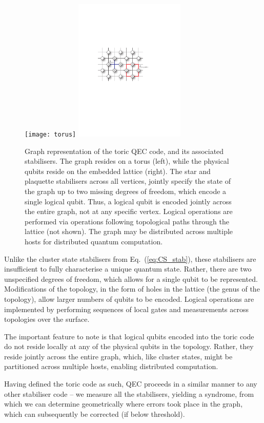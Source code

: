\begin{figure}[htpb]
	\texttt{[image: torus]}
	\includegraphics[width=0.47\textwidth]{toric_code}
	\caption{Graph representation of the toric QEC code, and its associated stabilisers. The graph resides on a torus (left), while the physical qubits reside on the embedded lattice (right). The star and plaquette stabilisers across all vertices, jointly specify the state of the graph up to two missing degrees of freedom, which encode a single logical qubit. Thus, a logical qubit is encoded jointly across the entire graph, not at any specific vertex. Logical operations are performed via operations following topological paths through the lattice (not shown). The graph may be distributed across multiple hosts for distributed quantum computation.} \label{fig:toric_code}
\end{figure}

Unlike the cluster state stabilisers from Eq.~(\ref{eq:CS_stab}), these stabilisers are insufficient to fully characterise a unique quantum state. Rather, there are two unspecified degrees of freedom, which allows for a single qubit to be represented. Modifications of the topology, in the form of holes in the lattice (the genus of the topology), allow larger numbers of qubits to be encoded. Logical operations are implemented by performing sequences of local gates and measurements across topologies over the surface.

The important feature to note is that logical qubits encoded into the toric code do not reside locally at any of the physical qubits in the topology. Rather, they reside jointly across the entire graph, which, like cluster states, might be partitioned across multiple hosts, enabling distributed computation.

Having defined the toric code as such, QEC proceeds in a similar manner to any other stabiliser code -- we measure all the stabilisers, yielding a syndrome, from which we can determine geometrically where errors took place in the graph, which can subsequently be corrected (if below threshold).

